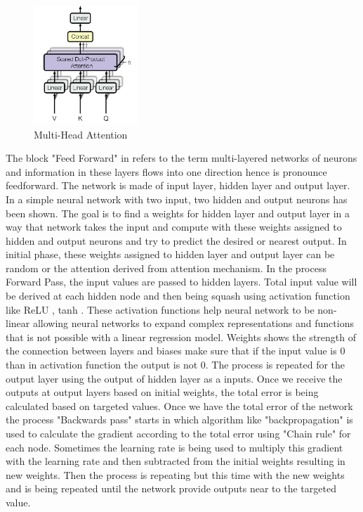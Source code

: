 \begin{figure}[!ht]
    \centering
    \includegraphics[width=0.35\textwidth]{chapters/images/Transformer/Multi_head.png}
    \caption{Multi-Head Attention \cite{vaswani2017attention}}
    \label{fig:multi_head}
\end{figure}



The block "Feed Forward" in  refers to the term multi-layered networks of neurons and information in these layers flows into one direction hence is pronounce feedforward. The network is made of input layer, hidden layer and output layer. In  a simple neural network with two input, two hidden and output neurons has been shown. The goal is to find a weights for hidden layer and output layer in a way that network takes the input and compute with these weights assigned to hidden and output neurons and try to predict the desired or nearest output. In initial phase, these weights assigned to hidden layer and output layer can be random or the attention derived from attention mechanism. In the process Forward Pass, the input values are passed to hidden layers. Total input value will be derived at each hidden node and then being squash using activation function like ReLU \cite{ReLU}, tanh \cite{tanh}. These activation functions help neural network to be non-linear allowing neural networks to expand complex representations and functions that is not possible with a linear regression model. Weights shows the strength of the connection between layers and biases make sure that if the input value is 0 than in activation function the output is not 0. The process is repeated for the output layer using the output of hidden layer as a inputs. Once we receive the outputs at output layers based on initial weights, the total error is being calculated based on targeted values. Once we have the total error of the network the process "Backwards pass" starts in which algorithm like "backpropagation" is used to calculate the gradient according to the total error using "Chain rule" for each node. Sometimes the learning rate is being used to multiply this gradient with the learning rate and then subtracted from the initial weights resulting in new weights. Then the process is repeating but this time with the new weights and is being repeated until the network provide outputs near to the targeted value. 


